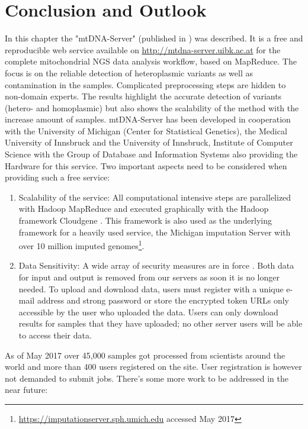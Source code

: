 \section{Conclusion and Outlook}
In this chapter the "mtDNA-Server" (published in \cite{Weissensteiner2016b}) was described. It is a free and reproducible web service available on \url{http://mtdna-server.uibk.ac.at} for the complete mitochondrial NGS data analysis workflow, based on MapReduce. The focus is on the reliable detection of heteroplasmic variants as well as contamination in the samples. Complicated preprocessing steps are hidden to non-domain experts. The results highlight the accurate detection of variants (hetero- and homoplasmic) but also shows the scalability of the method with the increase amount of samples. mtDNA-Server has been developed in cooperation with the University of Michigan (Center for Statistical Genetics), the Medical University of Innsbruck and the University of Innsbruck, Institute of Computer Science with the Group of Database and Information Systems also providing the Hardware for this service.
Two important aspects need to be considered when providing such a free service:
\begin{enumerate}
\item Scalability of the service: All computational intensive steps are parallelized with Hadoop MapReduce and executed graphically with the Hadoop framework Cloudgene \cite{Schonherr2012, Weissensteiner2016b}. This framework is also used as the underlying framework for a heavily used service, the Michigan imputation Server \cite{Das2016} with over 10 million imputed genomes\footnote{\url{https://imputationserver.sph.umich.edu} accessed May 2017}.
\item Data Sensitivity: A wide array of security measures are in force \cite{Weissensteiner2016a}. Both data for input and output is removed from our servers as soon it is no longer needed. To upload and download data, users must register with a unique e-mail address and strong password or store the encrypted token URLs only accessible by the user who uploaded the data. Users can only download results for samples that they have uploaded; no other server users will be able to access their data.
\end{enumerate}

As of May 2017 over 45,000 samples got processed from scientists around the world and more than 400 users registered on the site. User registration is however not demanded to submit jobs. There's some more work to be addressed in the near future:

